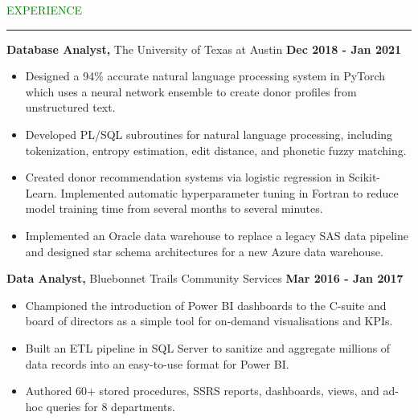 \documentclass [
        11pt
] {article}
\begin{document}

\noindent\textcolor{green}{EXPERIENCE \rule{15.8cm}{1pt}}

\vspace*{10pt}

\noindent \textbf {Database Analyst,} The University of Texas at Austin
\hspace*{\fill} \textbf {Dec 2018 - Jan 2021}


\begin{itemize}[itemsep=1pt,topsep=1pt]
\renewcommand{\labelitemi}{\scriptsize$\blacksquare$}

\item Designed a 94\% accurate natural language processing system in PyTorch 
which uses a neural network ensemble to create donor profiles from unstructured 
text.

\item Developed PL/SQL subroutines for natural language processing, including
tokenization, entropy estimation, edit distance, and phonetic fuzzy matching.

\item Created donor recommendation systems via logistic regression in Scikit-Learn.
Implemented automatic hyperparameter tuning in Fortran to reduce model training 
time from several months to several minutes.

\item Implemented an Oracle data warehouse to replace a legacy SAS data pipeline
and designed star schema architectures for a new Azure data warehouse.

\end{itemize}

\vspace*{5pt}

\noindent \textbf {Data Analyst,} Bluebonnet Trails Community Services
\hspace*{\fill} \textbf {Mar 2016 - Jan 2017}


\begin{itemize}[itemsep=1pt,topsep=1pt]
\renewcommand{\labelitemi}{\scriptsize$\blacksquare$}


\item Championed the introduction of Power BI dashboards to the C-suite 
and board of directors as a simple tool for on-demand visualisations and KPIs. 

\item Built an ETL pipeline in SQL Server to sanitize and aggregate
millions of data records into an easy-to-use format for Power BI.

\item Authored 60+ stored procedures, SSRS reports, dashboards, views, 
and ad-hoc queries for 8 departments.

\end{itemize}
\end{document}

